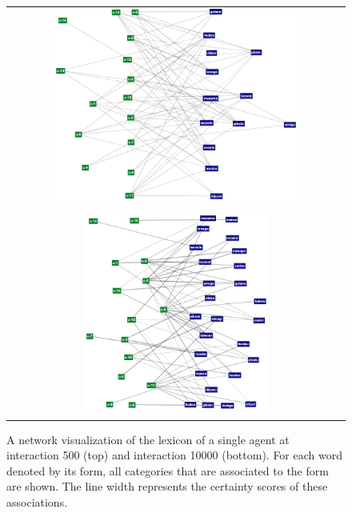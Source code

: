 \begin{figure}[p]
  \begin{tabular}{c}
    \includegraphics[width=0.73\textwidth]{figures/sfwm-lexicon-500} \\
    \\
    \\
    \includegraphics[width=0.55\textwidth]{figures/sfwm-lexicon-10000} \\
    \\
  \end{tabular}
  \caption{A network visualization of the lexicon of a single agent at
    interaction 500 (top) and interaction 10000 (bottom). For each
    word denoted by its form, all categories that are associated to
    the form are shown. The line width represents the certainty scores
    of these associations.  }
  \label{f:sfwm-semiotic-network}
\end{figure}

